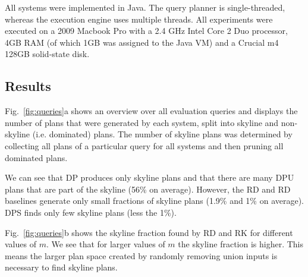




All systems were implemented in Java. The query planner is
single-threaded, whereas the execution engine uses multiple
threads. All experiments were executed on a 2009 Macbook Pro with a
2.4 GHz Intel Core 2 Duo processor, 4GB RAM (of which 1GB was assigned
to the Java VM) and a Crucial m4 128GB solid-state disk.


\subsection{Results}
Fig.~\ref{fig:queries}a shows an overview over all
evaluation queries and displays the number of plans that were
generated by each system, split into skyline and non-skyline (i.e.
dominated) plans. The number of skyline plans was determined by
collecting all plans of a particular query for all systems and then pruning all dominated plans. 

We can see that DP produces only skyline plans and that there are many
DPU plans that are part of the skyline (56\% on average). However, the
RD and RD baselines generate only small fractions of skyline plans (1.9\% and 1\% on
average). DPS finds only few skyline plans (less the 1\%). 

Fig.~\ref{fig:queries}b shows the skyline fraction found by RD and RK for different values of $m$. We see that for larger values of $m$ the skyline fraction is higher. This means the larger plan space created by randomly removing union inputs
is necessary to find skyline plans.


